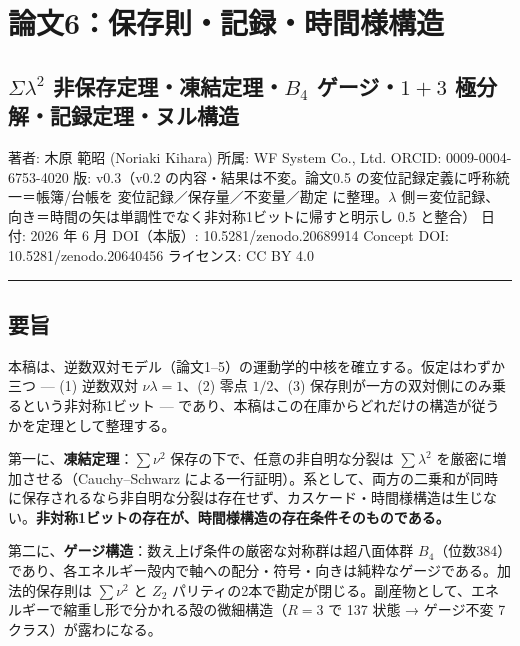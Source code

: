 \documentclass[
]{ltjsarticle}
\author{}
\date{}
\begin{document}
\section{論文6：保存則・記録・時間様構造}\label{ux8ad6ux65876ux4fddux5b58ux5247ux8a18ux9332ux6642ux9593ux69d8ux69cbux9020}

\subsection{\texorpdfstring{\(\Sigma\lambda^2\)
非保存定理・凍結定理・\(B_4\) ゲージ・\(1{+}3\)
極分解・記録定理・ヌル構造}{\textbackslash Sigma\textbackslash lambda\^{}2 非保存定理・凍結定理・B\_4 ゲージ・1\{+\}3 極分解・記録定理・ヌル構造}}\label{sigmalambda2-ux975eux4fddux5b58ux5b9aux7406ux51cdux7d50ux5b9aux7406b_4-ux30b2ux30fcux30b813-ux6975ux5206ux89e3ux8a18ux9332ux5b9aux7406ux30ccux30ebux69cbux9020}

著者: 木原 範昭 (Noriaki Kihara) 所属: WF System Co., Ltd. ORCID:
0009-0004-6753-4020 版: v0.3（v0.2 の内容・結果は不変。論文0.5
の変位記録定義に呼称統一＝帳簿/台帳を 変位記録／保存量／不変量／勘定
に整理。\(\lambda\)
側＝変位記録、向き＝時間の矢は単調性でなく非対称1ビットに帰すと明示し
0.5 と整合） 日付: 2026 年 6 月 DOI（本版）: 10.5281/zenodo.20689914
Concept DOI: 10.5281/zenodo.20640456 ライセンス: CC BY 4.0

\begin{center}\rule{0.5\linewidth}{0.5pt}\end{center}

\subsection{要旨}\label{ux8981ux65e8}

本稿は、逆数双対モデル（論文1--5）の運動学的中核を確立する。仮定はわずか三つ
--- (1) 逆数双対 \(\nu\lambda=1\)、(2) 零点 \(1/2\)、(3)
保存則が一方の双対側にのみ乗るという非対称1ビット ---
であり、本稿はこの在庫からどれだけの構造が従うかを定理として整理する。

第一に、\textbf{凍結定理}：\(\sum\nu^2\)
保存の下で、任意の非自明な分裂は \(\sum\lambda^2\)
を厳密に増加させる（Cauchy--Schwarz
による一行証明）。系として、両方の二乗和が同時に保存されるなら非自明な分裂は存在せず、カスケード・時間様構造は生じない。\textbf{非対称1ビットの存在が、時間様構造の存在条件そのものである。}

第二に、\textbf{ゲージ構造}：数え上げ条件の厳密な対称群は超八面体群
\(B_4\)（位数384）であり、各エネルギー殻内で軸への配分・符号・向きは純粋なゲージである。加法的保存則は
\(\sum\nu^2\) と \(Z_2\)
パリティの2本で勘定が閉じる。副産物として、エネルギーで縮重し形で分かれる殻の微細構造（\(R=3\)
で 137 状態 → ゲージ不変 7 クラス）が露わになる。
\end{document}
